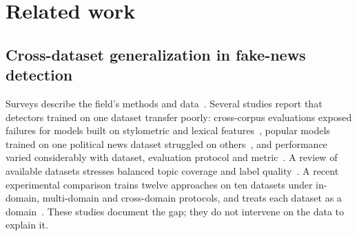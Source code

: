 \section{Related work}
\subsection{Cross-dataset generalization in fake-news detection}
Surveys describe the field's methods and data~\cite{shu2017survey,zhou2020survey,lazer2018science}. Several studies report that detectors trained on one dataset transfer poorly: cross-corpus evaluations exposed failures for models built on stylometric and lexical features~\cite{janicka2019cross}, popular models trained on one political news dataset struggled on others~\cite{hoy2022generalisability}, and performance varied considerably with dataset, evaluation protocol and metric~\cite{bozarth2020toward}. A review of available datasets stresses balanced topic coverage and label quality~\cite{asr2019big}. A recent experimental comparison trains twelve approaches on ten datasets under in-domain, multi-domain and cross-domain protocols, and treats each dataset as a domain~\cite{delloglio2026comparison}. These studies document the gap; they do not intervene on the data to explain it.

